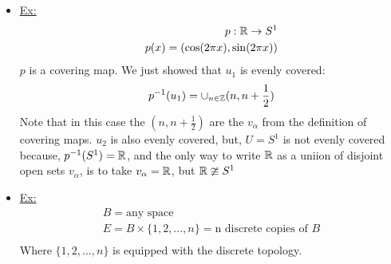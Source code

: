     \begin{itemize}
        \item \underline{Ex:}
            \begin{align*}
                p: \mathbb{R} \rightarrow S^1\\
                p(x)=(\cos(2\pi x), \sin(2\pi x))\\
            \end{align*}
            $p$ is a covering map. We just showed that $u_1$ is evenly covered:
            \begin{align*}
                p^{-1}(u_1)=\cup_{n\in \mathbb{Z}}(n,n+\frac{1}{2})\\
            \end{align*}
            Note that in this case the $(n, n+\frac{1}{2})$ are the $v_\alpha$ from the definition of
            covering maps. $u_2$ is also evenly covered, but, $U=S^{1}$ is not evenly covered because,
            $p^{-1}(S^{1})=\mathbb{R}$, and the only way to write $\mathbb{R}$ as a uniion of disjoint open sets $v_\alpha$,
            is to take $v_\alpha=\mathbb{R}$, but $\mathbb{R} \ncong S^1$
        \item \underline{Ex:}
            \begin{align*}
                B=\text{any space}\\
                E=B\times \{1,2,...,n\}=\text{n discrete copies of $B$}\\
            \end{align*}
            Where $\{1,2,...,n\}$ is equipped with the discrete topology.
    \end{itemize}

